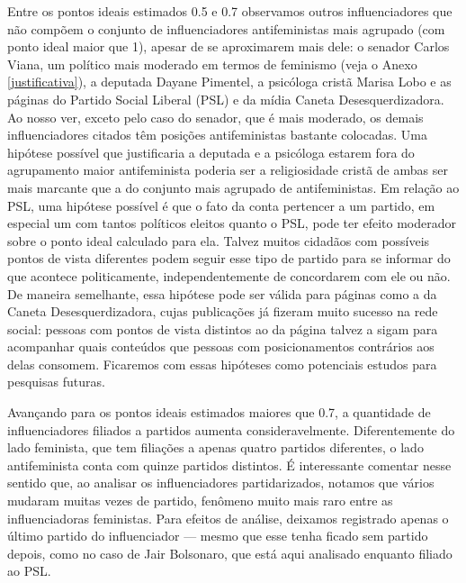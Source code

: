 \documentclass[
	12pt,				%
	openright,			%
	twoside,			%
	a4paper,			%
	english,			%
	brazil				%
	]{abntex2}
\begin{document}
 Entre os pontos ideais estimados 0.5 e 0.7 observamos outros influenciadores que não compõem o conjunto de influenciadores antifeministas mais agrupado (com ponto ideal maior que 1), apesar de se aproximarem mais dele: o senador Carlos Viana, um político mais moderado em termos de feminismo (veja o Anexo \ref{justificativa}), a deputada Dayane Pimentel, a psicóloga cristã Marisa Lobo e as páginas do Partido Social Liberal (PSL) e da mídia Caneta Desesquerdizadora. Ao nosso ver, exceto pelo caso do senador, que é mais moderado, os demais influenciadores citados têm posições antifeministas bastante colocadas. Uma hipótese possível que justificaria a deputada e a psicóloga estarem fora do agrupamento maior antifeminista poderia ser a religiosidade cristã de ambas ser mais marcante que a do conjunto mais agrupado de antifeministas. Em relação ao PSL, uma hipótese possível é que o fato da conta pertencer a um partido, em especial um com tantos políticos eleitos quanto o PSL, pode ter efeito moderador sobre o ponto ideal calculado para ela. Talvez muitos cidadãos com possíveis pontos de vista diferentes podem seguir esse tipo de partido para se informar do que acontece politicamente, independentemente de concordarem com ele ou não. De maneira semelhante, essa hipótese pode ser válida para páginas como a da Caneta Desesquerdizadora, cujas publicações já fizeram muito sucesso na rede social: pessoas com pontos de vista distintos ao da página talvez a sigam para acompanhar quais conteúdos que pessoas com posicionamentos contrários aos delas consomem. Ficaremos com essas hipóteses como potenciais estudos para pesquisas futuras.
 
 Avançando para os pontos ideais estimados maiores que 0.7, a quantidade de influenciadores filiados a partidos aumenta consideravelmente. Diferentemente do lado feminista, que tem filiações a apenas quatro partidos diferentes, o lado antifeminista conta com quinze partidos distintos. É interessante comentar nesse sentido que, ao analisar os influenciadores partidarizados, notamos que vários mudaram muitas vezes de partido, fenômeno muito mais raro entre as influenciadoras feministas. Para efeitos de análise, deixamos registrado apenas o último partido do influenciador --- mesmo que esse tenha ficado sem partido depois, como no caso de Jair Bolsonaro, que está aqui analisado enquanto filiado ao PSL. 
 
\end{document}
